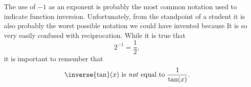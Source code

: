 \begin{Digression}
\label{digression:inverse-function-notation}








The use of $-1$ as an exponent is probably the most common notation
used to indicate function inversion. Unfortunately, from the
standpoint of a student it is also probably the worst possible
notation we could have invented because It is so very easily confused
with reciprocation. While it is true that
  \begin{equation}
    \label{eq:NegOneRecip}
    2^{-1} = \frac12,
\end{equation}
it is important to remember that
\begin{equation}
  \label{eq:NegOneInv}
  \inverse{\tan}(x) \text{ is \emph{not} equal to } \frac{1}{\tan(x)}.
\end{equation}


\end{Digression}
